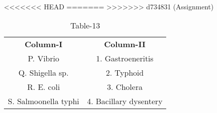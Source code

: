 \begin{table}[htbp]
  \centering
  \caption{Table-13}
<<<<<<< HEAD
  \label{tab:tables/table13.tex}
=======
  \label{table13}
>>>>>>> d734831 (Assignment)
  \begin{tabular}{cc}
\textbf{Column-I} & \textbf{Column-II}\\

P. Vibrio & 1. Gastroeneritis \\
Q. Shigella sp. & 2. Typhoid \\
R. E. coli & 3. Cholera \\
S. Salmoonella typhi & 4. Bacillary dysentery \\
  
  
  
  \end{tabular}
\end{table}